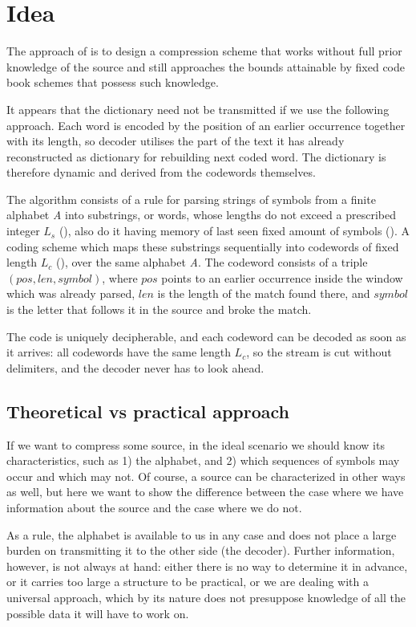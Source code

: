 \section{Idea}

The approach of \cite{ziv1977} is to design a compression scheme that works without full prior knowledge of the source and still approaches the bounds attainable by fixed code book schemes that possess such knowledge.

It appears that the dictionary need not be transmitted if we use the following approach. Each word is encoded by the position of an earlier occurrence together with its length, so decoder utilises the part of the text it has already reconstructed as dictionary for rebuilding next coded word. The dictionary is therefore dynamic and derived from the codewords themselves.

The algorithm consists of a rule for parsing strings of symbols from a finite alphabet \emph{A} into substrings, or words, whose lengths do not exceed a prescribed integer \(L_s\) (), also do it having memory of last seen fixed amount of symbols (). A coding scheme which maps these substrings sequentially into codewords of fixed length \(L_c\) (), over the same alphabet \emph{A}. The codeword consists of a triple \((\mathit{pos}, \mathit{len}, \mathit{symbol})\), where \(\mathit{pos}\) points to an earlier occurrence inside the window which was already parsed, \(\mathit{len}\) is the length of the match found there, and \(\mathit{symbol}\) is the letter that follows it in the source and broke the match. 

The code is uniquely decipherable, and each codeword can be decoded as soon as
it arrives: all codewords have the same length \(L_c\), so the stream is cut without delimiters, and the decoder never has to look ahead.

\subsection{Theoretical vs practical approach}
If we want to compress some source, in the ideal scenario we should know its characteristics, such as 1) the alphabet, and 2) which sequences of symbols may occur and which may not. Of course, a source can be characterized in other ways as well, but here we want to show the difference between the case where we have information about the source and the case where we do not.

As a rule, the alphabet is available to us in any case and does not place a large burden on transmitting it to the other side (the decoder). Further information, however, is not always at hand: either there is no way to determine it in advance, or it carries too large a structure to be practical, or we are dealing with a universal approach, which by its nature does not presuppose knowledge of all the possible data it will have to work on.

